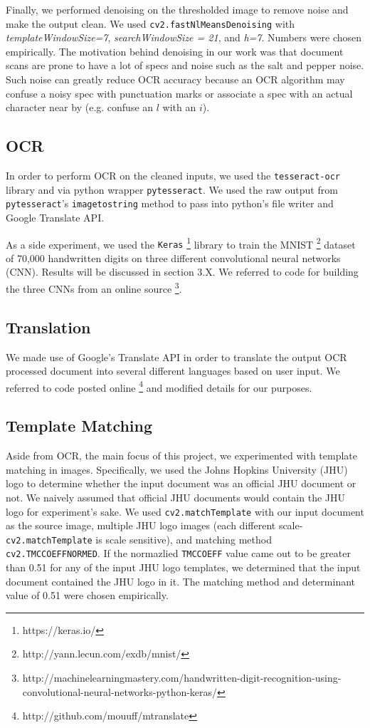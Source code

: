 \documentclass[11pt,letterpaper]{article}
\begin{document}
Finally, we performed denoising on the thresholded image to remove noise and make the output clean. We used {\tt cv2.fastNlMeansDenoising} with \textit{templateWindowSize=7}, \textit{searchWindowSize = 21}, and \textit{h=7}. Numbers were chosen empirically. The motivation behind denoising in our work was that document scans are prone to have a lot of specs and noise such as the salt and pepper noise. Such noise can greatly reduce OCR accuracy because an OCR algorithm may confuse a noisy spec with punctuation marks or associate a spec with an actual character near by (e.g. confuse an $l$ with an $i$).

\subsection{OCR}

In order to perform OCR on the cleaned inputs, we used the {\tt tesseract-ocr} library and via python wrapper {\tt pytesseract}. We used the raw output from {\tt pytesseract}'s {\tt image\textunderscore to\textunderscore string} method to pass into python's file writer and Google Translate API.

As a side experiment, we used the {\tt Keras} \footnote{https://keras.io/} library to train the MNIST \footnote{http://yann.lecun.com/exdb/mnist/} dataset of 70,000 handwritten digits on three different convolutional neural networks (CNN). Results will be discussed in section 3.X. We referred to code for building the three CNNs from an online source \footnote{http://machinelearningmastery.com/handwritten-digit-recognition-using-convolutional-neural-networks-python-keras/}.

\subsection{Translation}

We made use of Google's Translate API in order to translate the output OCR processed document into several different languages based on user input. We referred to code posted online \footnote{http://github.com/mouuff/mtranslate} and modified details for our purposes.

\subsection{Template Matching}

Aside from OCR, the main focus of this project, we experimented with template matching in images. Specifically, we used the Johns Hopkins University (JHU) logo to determine whether the input document was an official JHU document or not. We naively assumed that official JHU documents would contain the JHU logo for experiment's sake. We used {\tt cv2.matchTemplate} with our input document as the source image, multiple JHU logo images (each different scale-{\tt cv2.matchTemplate} is scale sensitive), and matching method {\tt cv2.TM\textunderscore CCOEFF\textunderscore NORMED}. If the normazlied {\tt TM\textunderscore CCOEFF} value came out to be greater than 0.51 for any of the input JHU logo templates, we determined that the input document contained the JHU logo in it. The matching method and determinant value of 0.51 were chosen empirically.
\end{document}
